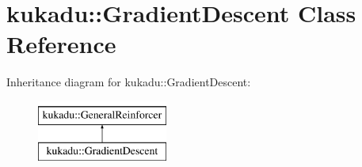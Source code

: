 \hypertarget{classkukadu_1_1GradientDescent}{\section{kukadu\-:\-:Gradient\-Descent Class Reference}
\label{classkukadu_1_1GradientDescent}
}
Inheritance diagram for kukadu\-:\-:Gradient\-Descent\-:\begin{figure}[H]
\begin{center}
\leavevmode
\includegraphics[height=2.000000cm]{classkukadu_1_1GradientDescent}
\end{center}
\end{figure}
